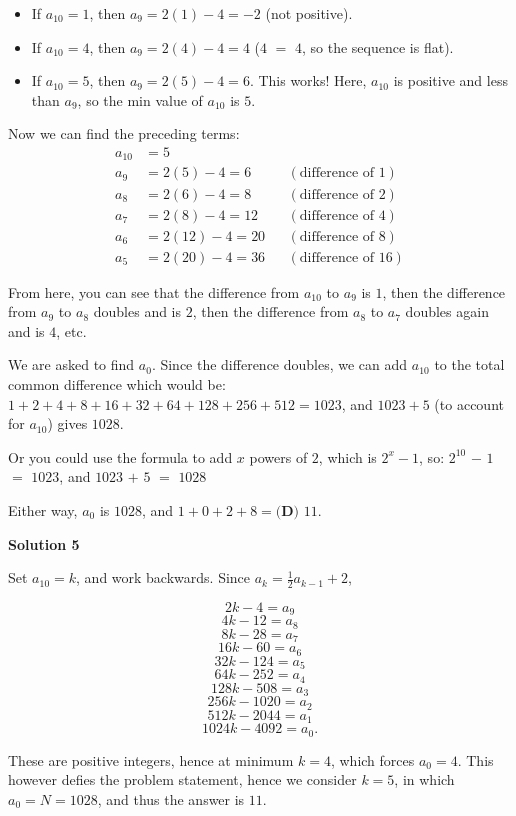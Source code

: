 \begin{enumerate}
 
            \begin{itemize}
        \item If $a_{10} = 1$, then $a_9 = 2(1) - 4 = -2$ (not positive).
        \item If $a_{10} = 4$, then $a_9 = 2(4) - 4 = 4$ ($4$ $=$ $4$, so the sequence is flat).
        \item If $a_{10} = 5$, then $a_9 = 2(5) - 4 = 6$. This works! Here, $a_{10}$ is positive and less than $a_{9}$, so the min value of $a_{10}$ is $5$.
            \end{itemize}
            Now we can find the preceding terms:
 \begin{align*} a_{10} &= 5 \\ a_9 &= 2(5) - 4 = 6 && (\text{difference of } 1) \\ a_8 &= 2(6) - 4 = 8 && (\text{difference of } 2) \\ a_7 &= 2(8) - 4 = 12 && (\text{difference of } 4) \\ a_6 &= 2(12) - 4 = 20 && (\text{difference of } 8) \\ a_5 &= 2(20) - 4 = 36 && (\text{difference of } 16) \end{align*}


 From here, you can see that the difference from $a_{10}$ to $a_9$ is $1$, then the difference from $a_9$ to $a_8$ doubles and is $2$, then the difference from $a_8$ to $a_7$ doubles again and is $4$, etc.

 We are asked to find $a_0$. Since the difference doubles, we can add $a_{10}$ to the total common difference which would be:$1 + 2 + 4 + 8 + 16 + 32 + 64 + 128 + 256 + 512 = 1023$, and $1023 + 5$ (to account for $a_{10}$) gives $1028$.

 Or you could use the formula to add $x$ powers of $2$, which is $2^{x} - 1$, so: $2^{10}$ $-$ $1$ $=$ $1023$, and $1023$ $+$ $5$ $=$ $1028$

 Either way, $a_0$ is $1028$, and $1 + 0 + 2 + 8 = \boxed{\textbf{(D) } 11}$.

 



\textbf{Solution 5}

Set $a_{10} = k$, and work backwards. Since $a_k = \frac{1}{2} a_{k-1} + 2$,

 
 \[2k-4 = a_{9}\]
 \[4k-12 = a_{8}\]
 \[8k-28 = a_{7}\]
 \[16k-60 = a_6\]
 \[32k-124=a_5\]
 \[64k-252 = a_4\]
 \[128k-508= a_3\]
 \[256k - 1020 = a_2\]
 \[512k - 2044 = a_1\]
 \[1024k - 4092 = a_0.\]

 These are positive integers, hence at minimum $k = 4$, which forces $a_0 = 4$. This however defies the problem statement, hence we consider $k = 5$, in which $a_0 = N = 1028$, and thus the answer is $\boxed{11}$.


\end{enumerate}
